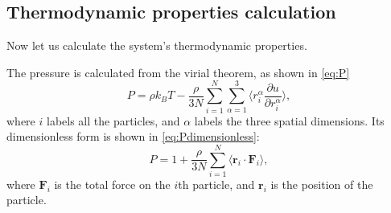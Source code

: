 \subsection{Thermodynamic properties calculation}

Now let us calculate the  system's thermodynamic properties.

The pressure is calculated from the virial theorem, as shown in \eqref{eq:P}
%
\begin{equation}\label{eq:P}
    P = \rho k_B T - \frac{ \rho }{ 3N } \sum_{i=1}^{N} \sum_{\alpha=1}^{3}
    \biggl \langle r_i^\alpha \frac{ \partial u }{ \partial r_i^\alpha } \biggr \rangle,
\end{equation}
%
where $i$ labels all the particles, and $\alpha$ labels the three spatial dimensions.
Its dimensionless form is shown in \eqref{eq:Pdimensionless}:
%
\begin{equation}\label{eq:Pdimensionless}
    P = 1 + \frac{ \rho }{ 3N } \sum_{i=1}^{N}
    \langle \bm{r}_i \cdot \bm{F}_i \rangle,
\end{equation}
%
where $\bm{F}_i$ is the total force on the $i$th particle, and $\bm{r}_i$ is the
position of the particle.

